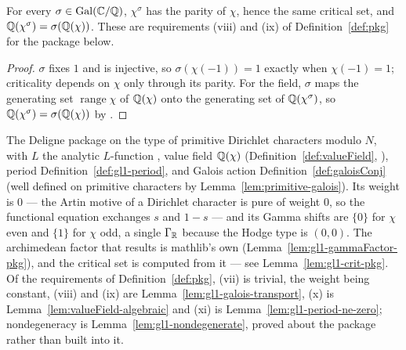 \begin{lemma}
  \label{lem:gl1-galois-transport}
  \leanok
  For every $\sigma \in \operatorname{Gal}(\mathbb{C}/\mathbb{Q})$, $\chi^{\sigma}$ has the parity of $\chi$,
  hence the same critical set, and $\mathbb{Q}(\chi^{\sigma}) = \sigma(\mathbb{Q}(\chi))$. These are
  requirements (viii) and (ix) of Definition~\ref{def:pkg} for the package below.
\end{lemma}
\begin{proof}
  \leanok
  $\sigma$ fixes $1$ and is injective, so $\sigma(\chi(-1)) = 1$ exactly when
  $\chi(-1) = 1$; criticality depends on $\chi$ only through its parity. For the field,
  $\sigma$ maps the generating set $\operatorname{range}\chi$ of $\mathbb{Q}(\chi)$ onto the
  generating set of $\mathbb{Q}(\chi^{\sigma})$, so $\mathbb{Q}(\chi^{\sigma}) = \sigma(\mathbb{Q}(\chi))$ by
  .
\end{proof}

\begin{definition}
  \label{def:gl1-pkg}
  \leanok
  The Deligne package on the type of primitive Dirichlet characters modulo $N$, with
  $L$ the analytic $L$-function , value field
  $\mathbb{Q}(\chi)$ (Definition~\ref{def:valueField}, ), period
  Definition~\ref{def:gl1-period}, and Galois action Definition~\ref{def:galoisConj}
  (well defined on primitive characters by Lemma~\ref{lem:primitive-galois}). Its weight is $0$
  --- the Artin motive of a Dirichlet character is pure of weight $0$, so the functional equation
  exchanges $s$ and $1-s$ --- and its Gamma shifts are $\{0\}$ for $\chi$ even and $\{1\}$ for
  $\chi$ odd, a single $\Gamma_{\mathbb{R}}$ because the Hodge type is $(0,0)$. The archimedean factor
  that results is mathlib's own 
  (Lemma~\ref{lem:gl1-gammaFactor-pkg}), and the critical set is computed from it --- see
  Lemma~\ref{lem:gl1-crit-pkg}. Of the requirements of Definition~\ref{def:pkg}, (vii) is
  trivial, the weight being constant, (viii) and (ix) are Lemma~\ref{lem:gl1-galois-transport},
  (x) is Lemma~\ref{lem:valueField-algebraic}
  and (xi) is Lemma~\ref{lem:gl1-period-ne-zero}; nondegeneracy is
  Lemma~\ref{lem:gl1-nondegenerate}, proved about the package rather than built into it.
\end{definition}

